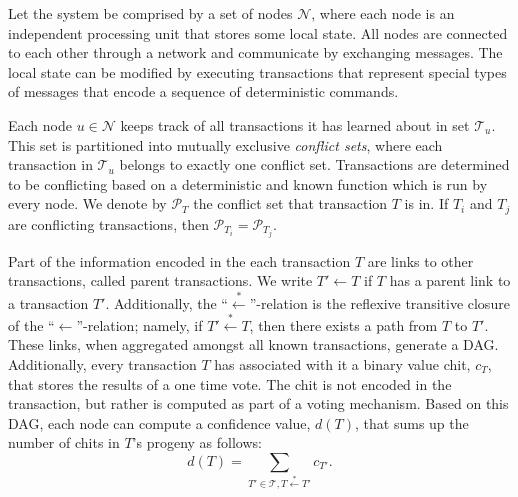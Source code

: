 Let the system be comprised by a set of nodes $\mathcal{N}$, where each node is an independent processing unit that stores some local state. 
All nodes are connected to each other through a network and communicate by exchanging messages.
The local state can be modified by executing transactions
that represent special types of messages that encode a sequence of deterministic commands.

Each node $u \in \mathcal{N}$ keeps track of all transactions it has learned about in set $\mathcal{T}_u$. 
This set is partitioned into mutually exclusive \emph{conflict sets},
where each transaction in $\mathcal{T}_u$ belongs to exactly one conflict set. 
Transactions are determined to be conflicting based on a deterministic and known function which is run by every node. 
We denote by $\mathcal{P}_T$ the conflict set that transaction $T$ is in.
If $T_i$ and $T_j$ are conflicting transactions, then
$\mathcal{P}_{T_i} = \mathcal{P}_{T_j}$.

Part of the information encoded in the each transaction $T$ are links to other transactions, called parent transactions. 
We write $T' \gets T$ if $T$ has a parent link to a transaction $T'$.
Additionally, the ``$\stackrel{*}{\gets}$''-relation is the reflexive transitive closure of the ``$\gets$''-relation; 
namely, if $T' \stackrel{*}{\gets} T$, then there exists a path from $T$ to $T'$. 
These links, when aggregated amongst all known transactions, generate a DAG. 
Additionally, every transaction $T$ has associated with it a binary value chit, $c_T$, that stores the results of a one time vote.
The chit is not encoded in the transaction, but rather is computed as part of a voting mechanism. 
Based on this DAG, each node can compute a confidence value, $d(T)$, that sums up the number of chits in $T$'s progeny as follows:
\[ d(T) = \sum_{T' \in \mathcal{T}, T \stackrel{*}{\gets} T'}c_{T'}.\]

